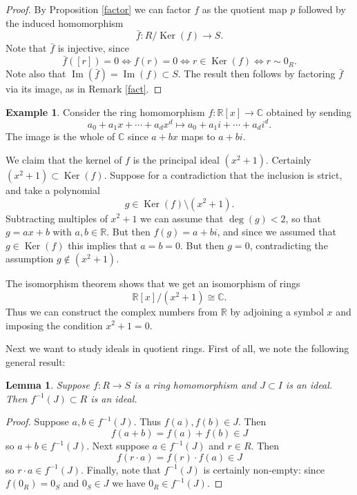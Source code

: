 \documentclass [12pt,oneside,a4paper,mathscr]{amsart}
\newtheorem{lemma}[thm]{Lemma}
\theoremstyle{definition}
\newtheorem{example}[thm]{Example}
\newcommand {\C}{\mathbb C}
\newcommand{\R}{\mathbb{R}}
\newcommand{\isom}{\cong}
\newcommand{\im}{\operatorname{Im}}
\renewcommand{\ker}{\operatorname{Ker}}
\begin{document}
\begin{proof}
 By Proposition \ref{factor} we can factor  $f$ as the quotient map $p$ followed by the  induced homomorphism
\[\bar{f}\colon R/\ker(f) \to S.\]
Note that $\bar{f}$  is injective, since
\[\bar{f}([r])=0 \iff f(r)=0\iff r\in \ker(f) \iff r\sim 0_R.\]
Note also that $\im(\bar{f})=\im(f)\subset S$.
The result then follows by factoring $\bar{f}$ via its image, as in Remark \ref{fact}.
\end{proof}



\begin{example}
Consider the ring homomorphism $f\colon \R[x] \to \C$ obtained by sending
\[a_0+a_1 x + \cdots + a_d x^d \mapsto a_0 + a_1 i + \cdots + a_d i^d.\]
The image is the whole of $\C$ since $a+bx$ maps to $a+bi$.

We claim that the kernel of $f$ is the principal ideal $(x^2+1)$. Certainly $(x^2+1)\subset \ker(f)$. Suppose for a contradiction that the inclusion is strict, and take a polynomial \[g\in \ker(f)\setminus (x^2+1).\]
Subtracting multiples of $x^2+1$ we can assume that $\operatorname{deg}(g)<2$, so that $g=ax+b$ with $a,b\in \R$. But then $f(g)=a+bi$, and since we assumed that $g\in \ker(f)$ this implies that $a=b=0$. But  then $g=0$, contradicting the assumption $g\notin (x^2+1)$.

The isomorphism theorem shows that we get an isomorphism of rings
\[\R[x]/(x^2+1) \isom \C.\]
Thus we can construct the complex numbers from $\R$ by adjoining a symbol $x$ and imposing the condition $x^2+1=0$.
\end{example}


Next we want to study ideals in quotient rings.   First of all, we note the following general result:

\begin{lemma}
Suppose $f\colon R\to S$ is a ring homomorphism and $J\subset I$ is an ideal. Then $f^{-1}(J)\subset R$ is an ideal.
\end{lemma}

\begin{proof}
Suppose $a,b\in f^{-1}(J)$. Thus $f(a),f(b)\in J$. Then  \[f(a+b)=f(a)+f(b)\in J\] so $a+b\in f^{-1}(J)$.
Next suppose $a\in f^{-1}(J)$ and $r\in R$. Then \[f(r\cdot a)=f(r)\cdot f(a)\in J\] so $r\cdot a\in f^{-1}(J)$. Finally, note that $f^{-1}(J)$ is certainly non-empty: since $f(0_R)=0_S$ and $0_S\in J$ we have $0_R\in f^{-1}(J)$.
\end{proof}
\end{document}
